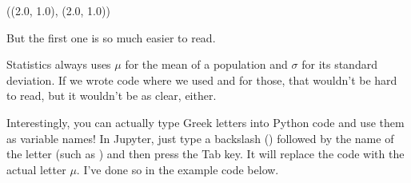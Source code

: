 \documentclass[letterpaper,10pt,english]{jupyterBook}
\begin{document}
\begin{sphinxVerbatim}[commandchars=\\\{\}]
 
\end{sphinxVerbatim}

\begin{sphinxVerbatim}[commandchars=\\\{\}]
((2.0, 1.0), (2.0, 1.0))
\end{sphinxVerbatim}

\sphinxAtStartPar
But the first one is so much easier to read.

\sphinxAtStartPar
{}  Statistics always uses \(\mu\) for the mean of a population and \(\sigma\) for its standard deviation.  If we wrote code where we used  and  for those, that wouldn’t be hard to read, but it wouldn’t be as clear, either.

\sphinxAtStartPar
Interestingly, you can actually type Greek letters into Python code and use them as variable names!  In Jupyter, just type a backslash (\sphinxcode{\sphinxupquote{\textbackslash{}}}) followed by the name of the letter (such as ) and then press the Tab key.  It will replace the code  with the actual letter \(\mu\).  I’ve done so in the example code below.

\begin{sphinxVerbatim}[commandchars=\\\{\}]
      
            
          \PYGZbs{}
              

    
\end{sphinxVerbatim}
\end{document}
